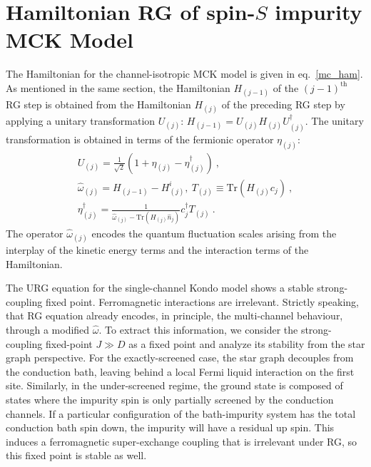 \documentclass[reprint,prb,superscriptaddress]{revtex4-2}
\begin{document}
\clearpage
\appendix
\section{Hamiltonian RG of spin-\(S\) impurity MCK Model}
\label{appendix_urg}
The Hamiltonian for the channel-isotropic MCK model is given in eq.~\ref{mc_ham}. As mentioned in the same section, the Hamiltonian \(H_{(j-1)}\) of the \((j-1)^\text{th}\) RG step is obtained from the Hamiltonian \(H_{(j)}\) of the preceding RG step by applying a unitary transformation \(U_{(j)}\): \(H_{(j-1)} = U_{(j)} H_{(j)} U^\dagger_{(j)}\). The unitary transformation is obtained in terms of the fermionic operator \(\eta_{(j)}\):
\begin{gather}
	U_{(j)} = \frac{1}{\sqrt 2}\left(1 + \eta_{(j)} - \eta_{(j)}^\dagger\right)~, \\
	\hat \omega_{(j)} = H_{(j-1)} - H^i_{(j)},~T_{(j)} \equiv \text{Tr}\left(H_{(j)}c_{j}\right)~,\\
	\eta^\dagger_{(j)} = \frac{1}{\hat \omega_{(j)} - \text{Tr}\left(H_{(j)} \hat n_{j}\right) } c^\dagger_{j} T_{(j)}~.
\end{gather}
The operator \(\hat \omega_{(j)}\) encodes the quantum fluctuation scales arising from the interplay of the kinetic energy terms and the interaction terms of the Hamiltonian.

The URG equation for the single-channel Kondo model \cite{kondo_urg} shows a stable strong-coupling fixed point. Ferromagnetic interactions are irrelevant. Strictly speaking, that RG equation already encodes, in principle, the multi-channel behaviour, through a modified \(\hat \omega\). To extract this information, we consider the strong-coupling fixed-point \(J \gg D\) as a fixed point and analyze its stability from the star graph perspective. For the exactly-screened case, the star graph decouples from the conduction bath, leaving behind a local Fermi liquid interaction on the first site. Similarly, in the under-screened regime, the ground state is composed of states where the impurity spin is only partially screened by the conduction channels. If a particular configuration of the bath-impurity system has the total conduction bath spin down, the impurity will have a residual up spin. This induces a ferromagnetic super-exchange coupling that is irrelevant under RG, so this fixed point is stable as well. 
\end{document}
